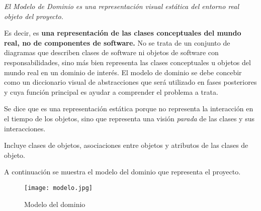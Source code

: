 \documentclass[a4paper,oneside,11pt]{book}
\begin{document}
{\it El Modelo de Dominio es una representación visual estática del entorno real objeto del proyecto.}


Es decir, es {\bf una representación de las clases conceptuales del mundo real, no de componentes de software.} No se trata de un conjunto de diagramas que describen clases de software ni objetos de software con responsabilidades, sino más bien representa las clases conceptuales u objetos del mundo real en un dominio de interés. 
El modelo de dominio  se debe concebir como un diccionario visual de abstracciones que será utilizado en fases posteriores y  cuya función principal es ayudar a comprender el problema a trata.

Se dice que es una representación estática porque no representa la interacción en el tiempo de los objetos, sino que representa una visión \textit{parada} de las clases y sus interacciones.

Incluye clases de objetos, asociaciones entre objetos y atributos de las clases de objeto.

A continuación se muestra el modelo del dominio que representa el proyecto.
\begin{figure}[H]
  \centering
    \texttt{[image: modelo.jpg]}
  \caption{Modelo del dominio}
\end{figure}

\end{document}
